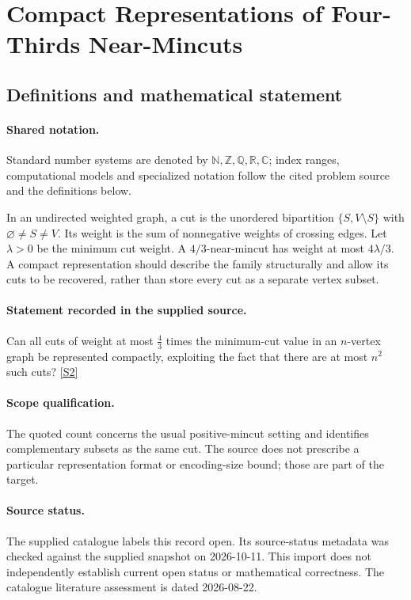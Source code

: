 \documentclass[11pt]{article}
\newcommand{\sref}[2]{\hyperlink{source:#1:#2}{[S#2]}}
\begin{document}
\section{Compact Representations of Four-Thirds Near-Mincuts}\label{statement}

\subsection{Definitions and mathematical statement}

\paragraph{Shared notation.}Standard number systems are denoted by $\mathbb N,\mathbb Z,\mathbb Q,\mathbb R,\mathbb C$; index ranges, computational models and specialized notation follow the cited problem source and the definitions below.


In an undirected weighted graph, a cut is the unordered bipartition $\{S,V\setminus S\}$ with $\varnothing\ne S\ne V$. Its weight is the sum of nonnegative weights of crossing edges. Let $\lambda>0$ be the minimum cut weight. A $4/3$-near-mincut has weight at most $4\lambda/3$. A compact representation should describe the family structurally and allow its cuts to be recovered, rather than store every cut as a separate vertex subset.
\paragraph{Statement recorded in the supplied source.}
Can all cuts of weight at most $\tfrac43$ times the minimum-cut value in an $n$-vertex graph be represented compactly, exploiting the fact that there are at most $n^2$ such cuts? \sref{statement}{2}
\paragraph{Scope qualification.}
The quoted count concerns the usual positive-mincut setting and identifies complementary subsets as the same cut. The source does not prescribe a particular representation format or encoding-size bound; those are part of the target.
\paragraph{Source status.}
The supplied catalogue labels this record open. Its source-status metadata was checked against the supplied snapshot on 2026-10-11. This import does not independently establish current open status or mathematical correctness. The catalogue literature assessment is dated 2026-08-22.
\end{document}
